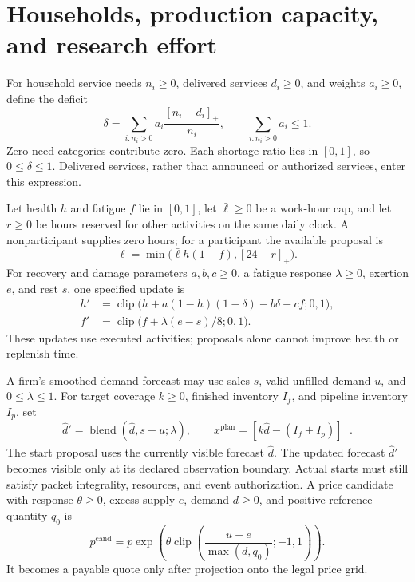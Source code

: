\documentclass[11pt,a4paper]{article}
\begin{document}
\section{Households, production capacity, and research effort}
For household service needs $n_i\geq0$, delivered services $d_i\geq0$, and weights $a_i\geq0$, define the deficit
\begin{equation}
\delta=\sum_{i:n_i>0}a_i\frac{[n_i-d_i]_+}{n_i},
\qquad \sum_{i:n_i>0}a_i\leq1.
\end{equation}
Zero-need categories contribute zero. Each shortage ratio lies in $[0,1]$, so $0\leq\delta\leq1$. Delivered services, rather than announced or authorized services, enter this expression.

Let health $h$ and fatigue $f$ lie in $[0,1]$, let $\bar\ell\geq0$ be a work-hour cap, and let $r\geq0$ be hours reserved for other activities on the same daily clock. A nonparticipant supplies zero hours; for a participant the available proposal is
\begin{equation}
\ell=\min\bigl(\bar\ell h(1-f),[24-r]_+\bigr).
\end{equation}
For recovery and damage parameters $a,b,c\geq0$, a fatigue response $\lambda\geq0$, exertion $e$, and rest $s$, one specified update is
\begin{equation}
\begin{aligned}
h'&=\operatorname{clip}\bigl(h+a(1-h)(1-\delta)-b\delta-cf;0,1\bigr),\\
f'&=\operatorname{clip}\bigl(f+\lambda(e-s)/8;0,1\bigr).
\end{aligned}
\end{equation}
These updates use executed activities; proposals alone cannot improve health or replenish time.

A firm's smoothed demand forecast may use sales $s$, valid unfilled demand $u$, and $0\leq\lambda\leq1$. For target coverage $k\geq0$, finished inventory $I_f$, and pipeline inventory $I_p$, set
\begin{equation}
\widehat d'=\operatorname{blend}(\widehat d,s+u;\lambda),\qquad
x^{\mathrm{plan}}=[k\widehat d-(I_f+I_p)]_+.
\end{equation}
The start proposal uses the currently visible forecast $\widehat d$. The updated forecast $\widehat d'$ becomes visible only at its declared observation boundary. Actual starts must still satisfy packet integrality, resources, and event authorization. A price candidate with response $\theta\geq0$, excess supply $e$, demand $d\geq0$, and positive reference quantity $q_0$ is
\begin{equation}
p^{\mathrm{cand}}=p\exp\left(\theta\operatorname{clip}\left(\frac{u-e}{\max(d,q_0)};-1,1\right)\right).
\end{equation}
It becomes a payable quote only after projection onto the legal price grid.
\end{document}
